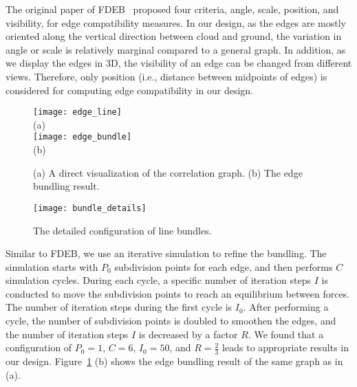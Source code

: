 The original paper of FDEB~\cite{holten2009force} proposed four criteria, angle, scale, position, and visibility, for edge compatibility measures. In our design, as the edges are mostly oriented along the vertical direction between cloud and ground, the variation in angle or scale is relatively marginal compared to a general graph. In addition, as we display the edges in 3D, the visibility of an edge can be changed from different views. Therefore, only position (i.e., distance between midpoints of edges) is considered for computing edge compatibility in our design.

\begin{figure}[t]
\begin{center}
\texttt{[image: edge\_line]} \\
\mbox{\small{(a)}} \\
\texttt{[image: edge\_bundle]} \\
\mbox{\small{(b)}}
\end{center}
\vspace{-.1in}
\caption{(a) A direct visualization of the correlation graph. (b) The edge bundling result.}
\label{fig:compareline}
\end{figure}

\begin{figure}[t]
\begin{center}
\texttt{[image: bundle\_details]}
\end{center}
\vspace{-.1in}
\caption{The detailed configuration of line bundles.}
\label{fig:linedetail}
\end{figure}

Similar to FDEB, we use an iterative simulation to refine the bundling. The simulation starts with $P_0$ subdivision points for each edge, and then performs $C$ simulation cycles. During each cycle, a specific number of iteration steps $I$ is conducted to move the subdivision points to reach an equilibrium between forces. The number of iteration steps during the first cycle is $I_0$. After performing a cycle, the number of subdivision points is doubled to smoothen the edges, and the number of iteration steps $I$ is decreased by a factor $R$. We found that a configuration of $P_0=1$, $C=6$, $I_0=50$, and $R=\frac{2}{3}$ leads to appropriate results in our design. Figure~\ref{fig:compareline} (b) shows the edge bundling result of the same graph as in (a).

